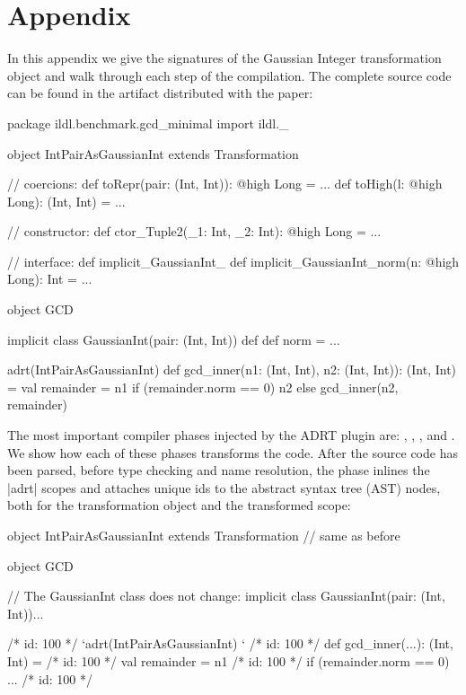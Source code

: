 \section*{Appendix}

In this appendix we give the signatures of the Gaussian Integer transformation object and walk through each step of the compilation. The complete source code can be found in the artifact distributed with the paper:

\begin{lstlisting-nobreak}
package ildl.benchmark.gcd_minimal
import ildl._

object IntPairAsGaussianInt extends Transformation{
  // coercions:
  def toRepr(pair: (Int, Int)): @high Long = ...
  def toHigh(l: @high Long): (Int, Int) = ...

  // constructor:
  def ctor_Tuple2(_1: Int, _2: Int): @high Long = ...

  // interface:
  def implicit_GaussianInt_%
  def implicit_GaussianInt_norm(n: @high Long): Int = ...
}
\end{lstlisting-nobreak}


\begin{lstlisting-nobreak}
object GCD {
  implicit class GaussianInt(pair: (Int, Int)) {
    def %
    def norm = ...
  }

  adrt(IntPairAsGaussianInt) {
    def gcd_inner(n1: (Int, Int), n2: (Int, Int)): (Int, Int) = {
      val remainder = n1 %
      if (remainder.norm == 0) n2 else gcd_inner(n2, remainder)
    }
  }
}
\end{lstlisting-nobreak}

The most important compiler phases injected by the ADRT plugin are: \postparser{}, \inject{}, \bridge{}, \coerce{} and \commit{}. We show how each of these phases transforms the code. After the source code has been parsed, before type checking and name resolution, the \postparser{} phase inlines the |adrt| scopes and attaches unique ids to the abstract syntax tree (AST) nodes, both for the transformation object and the transformed scope:

\begin{lstlisting-nobreak}
object IntPairAsGaussianInt extends Transformation{
  // same as before
}

object GCD {
  // The GaussianInt class does not change:
  implicit class GaussianInt(pair: (Int, Int))...

  /* id: 100 */ `adrt(IntPairAsGaussianInt) {}`
  /* id: 100 */ def gcd_inner(...): (Int, Int) = {
  /* id: 100 */        val remainder = n1 %
  /* id: 100 */        if (remainder.norm == 0) ...
  /* id: 100 */ }
}
\end{lstlisting-nobreak}

